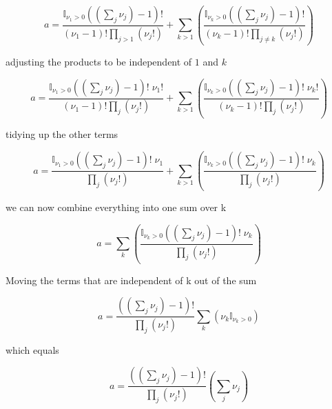 \documentclass{article}
\begin{document}
\begin{equation} 
a = \frac{\mathbb{I}_{\nu_1>0} \left(\left( \sum_j  \nu_j \right)-1\right)! }
{\left(\nu_1 - 1 \right)!\prod_{j>1} \left( \nu_j! \right)}
+ \sum_{k>1}\left(
\frac{\mathbb{I}_{\nu_k > 0} \left(\left( \sum_j  \nu_j \right)-1\right)!}
{ \left(\nu_k - 1 \right)!
\prod_{j \neq k} \left( \nu_j! \right)}
\right)
\end{equation}

\noindent adjusting the products to be independent of $1$ and $k$

\begin{equation} 
a = \frac{\mathbb{I}_{\nu_1>0} \left(\left( \sum_j  \nu_j \right)-1\right)! \; \nu_1!}
{\left(\nu_1 - 1 \right)!\prod_{j} \left( \nu_j! \right)}
+ \sum_{k>1}\left(
\frac{\mathbb{I}_{\nu_k > 0} \left(\left( \sum_j  \nu_j \right)-1\right)! \; \nu_k!}
{ \left(\nu_k - 1 \right)!
\prod_{j} \left( \nu_j! \right)}
\right)
\end{equation}

\noindent tidying up the other terms

\begin{equation} 
a = \frac{\mathbb{I}_{\nu_1>0} \left(\left( \sum_j  \nu_j \right)-1\right)! \; \nu_1}
{\prod_{j} \left( \nu_j! \right)}
+ \sum_{k>1}\left(
\frac{\mathbb{I}_{\nu_k > 0} \left(\left( \sum_j  \nu_j \right)-1\right)! \; \nu_k}
{ 
\prod_{j} \left( \nu_j! \right)}
\right)
\end{equation}

\noindent we can now combine everything into one sum over k

\begin{equation} 
a = \sum_{k}\left(
\frac{\mathbb{I}_{\nu_k > 0} \left(\left( \sum_j  \nu_j \right)-1\right)! \; \nu_k}
{ 
\prod_{j} \left( \nu_j! \right)}
\right)
\end{equation}

\noindent Moving the terms that are independent of k out of the sum

\begin{equation} 
a = \frac{\left(\left( \sum_j  \nu_j \right)-1\right)!}{\prod_{j} \left( \nu_j! \right)}\sum_{k}\left(
\nu_k \mathbb{I}_{\nu_k > 0}
\right)
\end{equation}

\noindent which equals

\begin{equation} 
a = \frac{\left(\left( \sum_j  \nu_j \right)-1\right)!}{\prod_{j} \left( \nu_j! \right)}\left( \sum_j  \nu_j \right)
\end{equation}
\end{document}
